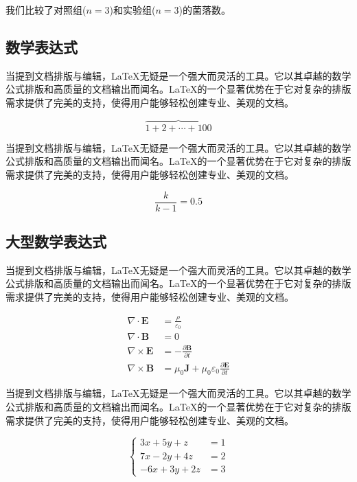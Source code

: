 \documentclass[AutoFakeBold,a4paper]{ctexart}
\begin{document}
我们比较了对照组($n=3$)和实验组($n=3$)的菌落数。

\subsection{数学表达式}


当提到文档排版与编辑，LaTeX无疑是一个强大而灵活的工具。它以其卓越的数学公式排版和高质量的文档输出而闻名。LaTeX的一个显著优势在于它对复杂的排版需求提供了完美的支持，使得用户能够轻松创建专业、美观的文档。

$$
    \overbrace{1+2+\cdots+100}
$$


当提到文档排版与编辑，LaTeX无疑是一个强大而灵活的工具。它以其卓越的数学公式排版和高质量的文档输出而闻名。LaTeX的一个显著优势在于它对复杂的排版需求提供了完美的支持，使得用户能够轻松创建专业、美观的文档。

\begin{equation}
    \frac{k}{k-1} = 0.5
\end{equation}

    
\subsection{大型数学表达式}


当提到文档排版与编辑，LaTeX无疑是一个强大而灵活的工具。它以其卓越的数学公式排版和高质量的文档输出而闻名。LaTeX的一个显著优势在于它对复杂的排版需求提供了完美的支持，使得用户能够轻松创建专业、美观的文档。

$$
    \begin{aligned}
        \nabla \cdot \mathbf{E} &= \frac {\rho} {\varepsilon_0} \\
        \nabla \cdot \mathbf{B} &= 0 \\
        \nabla \times \mathbf{E} &= -\frac{\partial \mathbf{B}} {\partial t} \\
        \nabla \times \mathbf{B} &= \mu_0\mathbf{J} + \mu_0\varepsilon_0\frac{\partial \mathbf{E}} {\partial t}
    \end{aligned}
$$


当提到文档排版与编辑，LaTeX无疑是一个强大而灵活的工具。它以其卓越的数学公式排版和高质量的文档输出而闻名。LaTeX的一个显著优势在于它对复杂的排版需求提供了完美的支持，使得用户能够轻松创建专业、美观的文档。

\begin{equation}
    \begin{cases}
        3x + 5y + z &= 1 \\
        7x - 2y + 4z &= 2 \\
        -6x + 3y + 2z &= 3
    \end{cases}
\end{equation}
\end{document}
